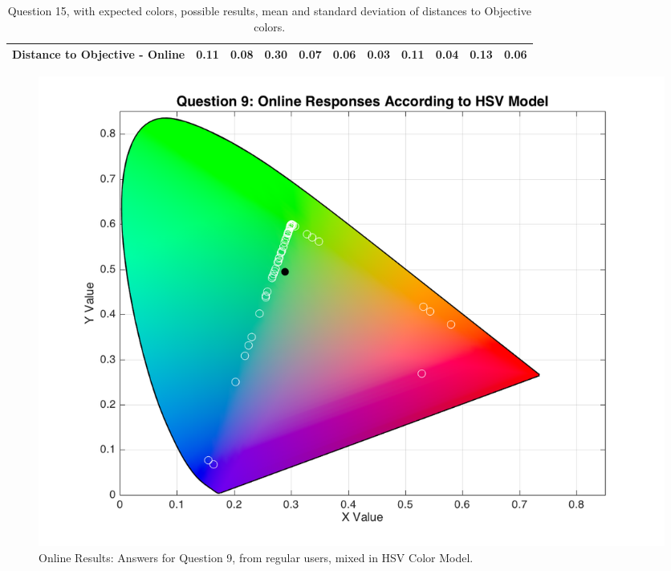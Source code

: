 \begin{table}[H]
{\begin{tabular}{lccccccccccccc}
    \multicolumn{4}{l}{Distance to Objective - Online}                                                                                               & \multicolumn{1}{|c}{0.11}        & \multicolumn{1}{c|}{0.08}    & \multicolumn{1}{|c}{0.30}        & \multicolumn{1}{c|}{0.07}    & \multicolumn{1}{|c}{\textbf{0.06}}       & \multicolumn{1}{c|}{0.03}    & \multicolumn{1}{|c}{0.11}        & \multicolumn{1}{c|}{0.04}    & \multicolumn{1}{|c}{0.13}       & \multicolumn{1}{c|}{0.06}    \\ \hline
    \end{tabular}}
  \caption[Question 15, with expected Results.]{Question 15, with expected colors, possible results, mean and standard deviation of distances to Objective colors.}
  \label{table:lab_q15_expected}
\end{table}
%
\begin{figure}[htbp]
  \centering
  \begin{minipage}{0.48\textwidth}
    \centering
    \includegraphics[width=\textwidth]{images/9_online_HSVresponses.png}
    \caption[Online Results: Answers for Question 9, from regular users, mixed in HSV Color Model.]{Online Results: Answers for Question 9, from regular users, mixed in HSV Color Model.}
    \label{fig:onlinehsvregular_9}
  \end{minipage}\hfill
  \begin{minipage}{0.48\textwidth}
    \centering

\end{minipage}
\end{figure}
